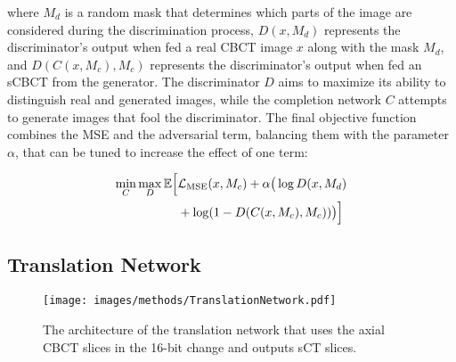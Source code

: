 where \( M_d \) is a random mask that determines which parts of the image are considered during the discrimination process, \( D(x, M_d) \) represents the discriminator's output when fed a real CBCT image \( x \) along with the mask \( M_d \), and \( D(C(x, M_c), M_c) \) represents the discriminator's output when fed an sCBCT from the generator.
The discriminator \( D \) aims to maximize its ability to distinguish real and generated images, while the completion network \( C \) attempts to generate images that fool the discriminator.
The final objective function combines the MSE and the adversarial term, balancing them with the parameter $\alpha$, that can be tuned to increase the effect of one term: 

\begin{align}
    \min_C \max_D \mathbb{E} \Big[ &\mathcal{L}_{\text{MSE}}(x, M_c) + \alpha \big( \log D(x, M_d) \nonumber \\
    & + \log(1 - D(C(x, M_c), M_c)) \big) \Big]
\label{eq:final_loss_completion}
\end{align}


\subsection{Translation Network}
\begin{figure*}[tb]
	\centering
		\texttt{[image: images/methods/TranslationNetwork.pdf]}
	\caption{The architecture of the translation network that uses the axial CBCT slices in the 16-bit change and outputs sCT slices.}
	\label{fig:image_translation_network}
\end{figure*}

